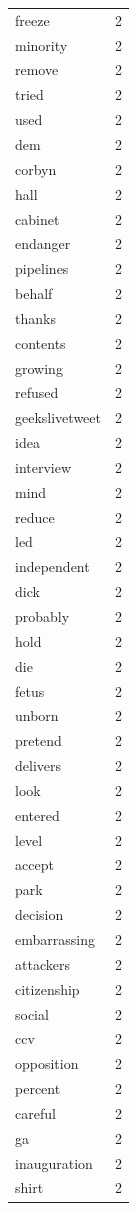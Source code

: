 \begin{tabular}{lr}
freeze & 2 \\
minority & 2 \\
remove & 2 \\
tried & 2 \\
used & 2 \\
dem & 2 \\
corbyn & 2 \\
hall & 2 \\
cabinet & 2 \\
endanger & 2 \\
pipelines & 2 \\
behalf & 2 \\
thanks & 2 \\
contents & 2 \\
growing & 2 \\
refused & 2 \\
geekslivetweet & 2 \\
idea & 2 \\
interview & 2 \\
mind & 2 \\
reduce & 2 \\
led & 2 \\
independent & 2 \\
dick & 2 \\
probably & 2 \\
hold & 2 \\
die & 2 \\
fetus & 2 \\
unborn & 2 \\
pretend & 2 \\
delivers & 2 \\
look & 2 \\
entered & 2 \\
level & 2 \\
accept & 2 \\
park & 2 \\
decision & 2 \\
embarrassing & 2 \\
attackers & 2 \\
citizenship & 2 \\
social & 2 \\
ccv & 2 \\
opposition & 2 \\
percent & 2 \\
careful & 2 \\
ga & 2 \\
inauguration & 2 \\
shirt & 2 \\

\end{tabular}
